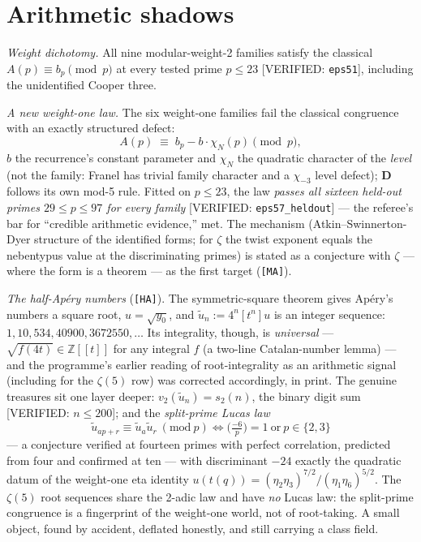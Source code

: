 \documentclass[11pt,reqno]{amsart}
\theoremstyle{plain}
\theoremstyle{definition}
\theoremstyle{remark}
\newcommand{\Z}{\mathbb{Z}}
\newcommand{\ut}{\tilde u}
\newcommand{\VerifiedR}[1]{\textup{\textsf{[VERIFIED: #1]}}}
\newcommand{\MA}{\texttt{[MA]}}
\newcommand{\HA}{\texttt{[HA]}}
\begin{document}
\section{Arithmetic shadows}\label{sec:arith}

\emph{Weight dichotomy.} All nine modular-weight-2 families satisfy the
classical $A(p)\equiv b_p\pmod p$ at every tested prime $p\le23$
\VerifiedR{\texttt{eps51}}, including the unidentified Cooper three.

\emph{A new weight-one law.} The six weight-one families fail the
classical congruence with an exactly structured defect:
\[
A(p)\;\equiv\;b_p-b\cdot\chi_N(p)\pmod p ,
\]
$b$ the recurrence's constant parameter and $\chi_N$ the quadratic
character of the \emph{level} (not the family: Franel has trivial family
character and a $\chi_{-3}$ level defect); $\mathbf D$ follows its own
mod-5 rule. Fitted on $p\le23$, the law \emph{passes all sixteen held-out
primes $29\le p\le97$ for every family}
\VerifiedR{\texttt{eps57\_heldout}} --- the referee's bar for ``credible
arithmetic evidence,'' met. The mechanism (Atkin--Swinnerton-Dyer
structure of the identified forms; for $\zeta$ the twist exponent equals
the nebentypus value at the discriminating primes) is stated as a
conjecture with $\zeta$ --- where the form is a theorem --- as the first
target (\MA).

\emph{The half-Ap\'ery numbers} (\HA). The symmetric-square theorem gives
Ap\'ery's numbers a square root, $u=\sqrt{y_0}$, and
$\ut_n:=4^n[t^n]u$ is an integer sequence:
$1,10,534,40900,3672550,\dots$ Its integrality, though, is
\emph{universal} --- $\sqrt{f(4t)}\in\Z[[t]]$ for any integral $f$ (a
two-line Catalan-number lemma) --- and the programme's earlier reading of
root-integrality as an arithmetic signal (including for the $\zeta(5)$
row) was corrected accordingly, in print. The genuine treasures sit one
layer deeper: $v_2(\ut_n)=s_2(n)$, the binary digit sum
\VerifiedR{$n\le200$}; and the \emph{split-prime Lucas law}
\[
\ut_{ap+r}\equiv\ut_a\ut_r\ (\mathrm{mod}\ p)
\iff
\bigl(\tfrac{-6}p\bigr)=1\ \text{or}\ p\in\{2,3\}
\]
--- a conjecture verified at fourteen primes with perfect correlation,
predicted from four and confirmed at ten --- with discriminant $-24$
exactly the quadratic datum of the weight-one eta identity
$u(t(q))=(\eta_2\eta_3)^{7/2}/(\eta_1\eta_6)^{5/2}$. The $\zeta(5)$ root
sequences share the 2-adic law and have \emph{no} Lucas law: the
split-prime congruence is a fingerprint of the weight-one world, not of
root-taking. A small object, found by accident, deflated honestly, and
still carrying a class field.
\end{document}
